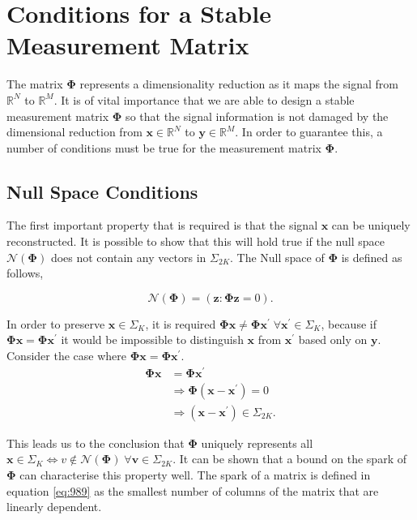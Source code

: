 \section{Conditions for a Stable Measurement Matrix}
\label{sec:sensing-matrices}
The matrix $\boldsymbol{\Phi}$ represents a dimensionality reduction as it maps the signal from $\mathbb{R}^N$ to $\mathbb{R}^M$.  It is of vital importance that we are able to design a stable measurement matrix $\boldsymbol{\Phi}$ so that the signal information is not damaged by the dimensional reduction from $\boldsymbol{x} \in \mathbb{R}^N$ to $\boldsymbol{y} \in \mathbb{R}^M$. In order to guarantee this, a number of conditions must be true for the measurement matrix $\boldsymbol{\Phi}$.

\subsection{Null Space Conditions}
\label{sec:null-space-property}

The first important property that is required is that the signal $\boldsymbol{x}$ can be uniquely reconstructed. It is possible to show that this will hold true if the null space $\mathcal{N}(\boldsymbol{\Phi})$ does not contain any vectors in $\Sigma_{2K}$. The Null space of $\boldsymbol{\Phi}$ is defined as follows,

\begin{equation}
  \mathcal{N}(\boldsymbol{\Phi}) = (\boldsymbol{z}:\boldsymbol{\Phi}\boldsymbol{z}=0). 
\end{equation}

In order to preserve $\boldsymbol{x} \in \Sigma_K$, it is required $\boldsymbol{\Phi x} \neq \boldsymbol{\Phi x^{\prime}} \; \forall  \boldsymbol{x^{\prime}} \in \Sigma_K$, because  if $\boldsymbol{\Phi x} = \boldsymbol{\Phi x^{\prime}}$ it would be impossible to distinguish $\boldsymbol{x}$ from $\boldsymbol{x^{\prime}}$ based only on $\boldsymbol{y}$. Consider the case where $\boldsymbol{\Phi x} = \boldsymbol{\Phi x^{\prime}}$.
\begin{align*}
  \boldsymbol{\Phi x} &= \boldsymbol{\Phi x^{\prime}} \\
& \Rightarrow \boldsymbol{\Phi}(\boldsymbol{x} - \boldsymbol{x^{\prime}}) = 0\\
&\Rightarrow (\boldsymbol{x} - \boldsymbol{x^{\prime}}) \in \Sigma_{2K}.
\end{align*}

This leads us to the conclusion that $\boldsymbol{\Phi}$ uniquely represents all $\boldsymbol{x} \in \Sigma_K \iff v \notin \mathcal{N}( \boldsymbol{\Phi}) \; \forall \boldsymbol{v} \in \Sigma_{2K}$. 
It can be shown that a bound on the spark of $\boldsymbol{\Phi}$ can characterise this property well. The spark of a matrix is defined in equation \eqref{eq:989} as the smallest number of columns of the matrix that are linearly dependent.

